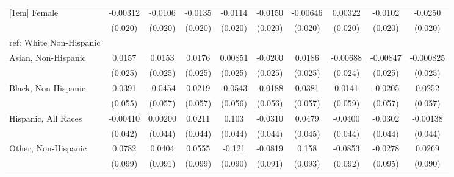 \begin{table}[htbp]
\begin{tabular}{l*{9}{c}}
[1em]
Female&    -0.00312         &     -0.0106         &     -0.0135         &     -0.0114         &     -0.0150         &    -0.00646         &     0.00322         &     -0.0102         &     -0.0250         \\
  &     (0.020)         &     (0.020)         &     (0.020)         &     (0.020)         &     (0.020)         &     (0.020)         &     (0.020)         &     (0.020)         &     (0.020)         \\
[1em]
ref: White Non-Hispanic&                     &                     &                     &                     &                     &                     &                     &                     &                     \\
[1em]
Asian, Non-Hispanic&      0.0157         &      0.0153         &      0.0176         &     0.00851         &     -0.0200         &      0.0186         &    -0.00688         &    -0.00847         &   -0.000825         \\
  &     (0.025)         &     (0.025)         &     (0.025)         &     (0.025)         &     (0.025)         &     (0.025)         &     (0.024)         &     (0.025)         &     (0.025)         \\
[1em]
Black, Non-Hispanic&      0.0391         &     -0.0454         &      0.0219         &     -0.0543         &     -0.0188         &      0.0381         &      0.0141         &     -0.0205         &      0.0252         \\
  &     (0.055)         &     (0.057)         &     (0.057)         &     (0.056)         &     (0.056)         &     (0.057)         &     (0.059)         &     (0.057)         &     (0.057)         \\
[1em]
Hispanic, All Races&    -0.00410         &     0.00200         &      0.0211         &       0.103\sym{**} &     -0.0310         &      0.0479         &     -0.0400         &     -0.0302         &    -0.00138         \\
  &     (0.042)         &     (0.044)         &     (0.044)         &     (0.044)         &     (0.044)         &     (0.045)         &     (0.044)         &     (0.044)         &     (0.044)         \\
[1em]
Other, Non-Hispanic&      0.0782         &      0.0404         &      0.0555         &      -0.121         &     -0.0819         &       0.158\sym{*}  &     -0.0853         &     -0.0278         &      0.0269         \\
  &     (0.099)         &     (0.091)         &     (0.099)         &     (0.090)         &     (0.091)         &     (0.093)         &     (0.092)         &     (0.095)         &     (0.090)         \\

\end{tabular}
\end{table}
